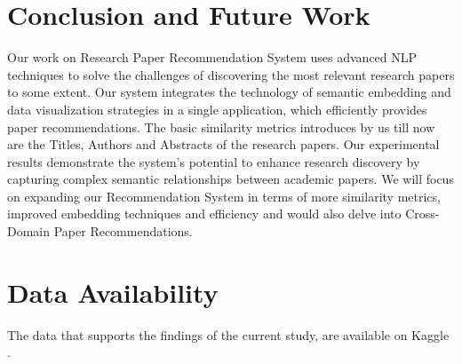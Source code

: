 \documentclass[runningheads]{llncs}
\begin{document}
\section{\textbf{Conclusion and Future Work}}
Our work on Research Paper Recommendation System uses advanced NLP techniques to solve the challenges of discovering the most relevant research papers to some extent. Our system integrates the technology of semantic embedding and data visualization strategies in a single application, which efficiently provides paper recommendations. The basic similarity metrics introduces by us till now are the Titles, Authors and Abstracts of the research papers. Our experimental results demonstrate the system's potential to enhance research discovery by capturing complex semantic relationships between academic papers.
\newline
We will focus on expanding our Recommendation System in terms of more similarity metrics, improved embedding techniques and efficiency and would also delve into Cross-Domain Paper Recommendations.

\section{\textbf{Data Availability}}
The data that supports the findings of the current study, are available on Kaggle \cite{r3}. 

\vspace{12pt}


\end{document}
